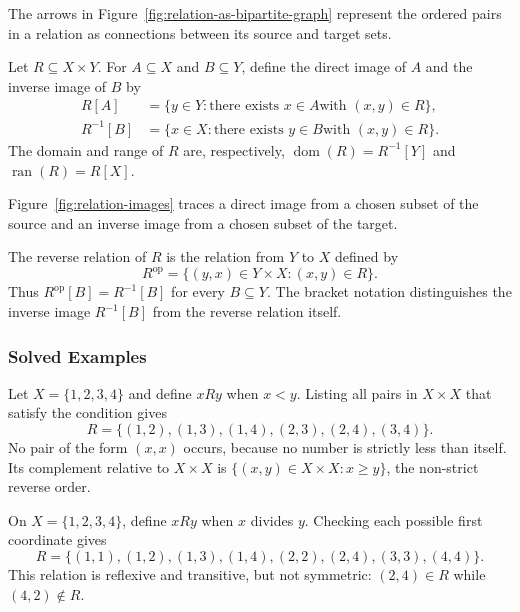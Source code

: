 The arrows in Figure~\ref{fig:relation-as-bipartite-graph} represent the ordered pairs in a relation as connections between its source and target sets.


\begin{definition}
Let $R\subseteq X\times Y$. For $A\subseteq X$ and $B\subseteq Y$, define the direct image of $A$ and the inverse image of $B$ by
\[
  \begin{aligned}
    R[A]&=\{y\in Y:\text{there exists }x\in A
      \text{with }(x,y)\in R\},\\
    R^{-1}[B]&=\{x\in X:\text{there exists }y\in B
      \text{with }(x,y)\in R\}.
  \end{aligned}
\]
The domain and range of $R$ are, respectively, $\operatorname{dom}(R)=R^{-1}[Y]$ and $\operatorname{ran}(R)=R[X]$.
\end{definition}

Figure~\ref{fig:relation-images} traces a direct image from a chosen subset of the source and an inverse image from a chosen subset of the target.


\begin{definition}
The reverse relation of $R$ is the relation from $Y$ to $X$ defined by
\[
  R^{\mathrm{op}}=\{(y,x)\in Y\times X:(x,y)\in R\}.
\]
Thus $R^{\mathrm{op}}[B]=R^{-1}[B]$ for every $B\subseteq Y$. The bracket notation distinguishes the inverse image $R^{-1}[B]$ from the reverse relation itself.
\end{definition}

\subsubsection{Solved Examples}

\begin{example}
Let $X=\{1,2,3,4\}$ and define $xRy$ when $x<y$. Listing all pairs in $X\times X$ that satisfy the condition gives
\[
  R=\{(1,2),(1,3),(1,4),(2,3),(2,4),(3,4)\}.
\]
No pair of the form $(x,x)$ occurs, because no number is strictly less than itself.
Its complement relative to $X\times X$ is $\{(x,y)\in X\times X:x\ge y\}$, the non-strict reverse order.
\end{example}

\begin{example}
On $X=\{1,2,3,4\}$, define $xRy$ when $x$ divides $y$. Checking each possible first coordinate gives
\[
  R=\{(1,1),(1,2),(1,3),(1,4),(2,2),(2,4),(3,3),(4,4)\}.
\]
This relation is reflexive and transitive, but not symmetric: $(2,4)\in R$ while $(4,2)\notin R$.
\end{example}

